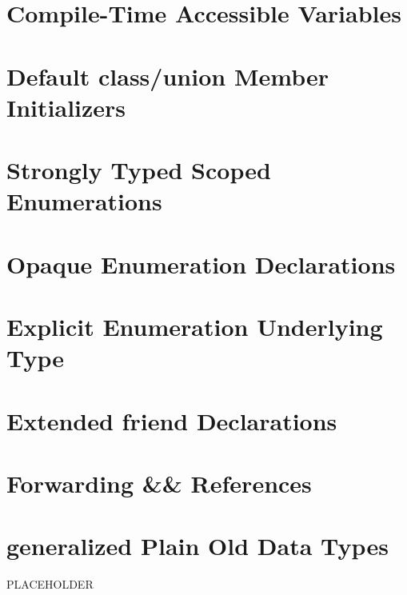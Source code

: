 \newpage
\section[{\tt constexpr} Variables]{Compile-Time Accessible Variables}\label{constexprvar}


\newpage
\section[Default Member Init]{Default {\SecCode class}/{\SecCode union} Member Initializers}\label{Default-Member-Initializers}


\newpage
\section[{\tt enum}~{\tt class}]{Strongly Typed Scoped Enumerations}\label{enumclass}


\newpage
\section[Opaque {\tt enum}s]{Opaque Enumeration Declarations}\label{enumopaque}\label{opaque-enumeration-declarations}


\newpage
\section[Underlying Type '11]{Explicit Enumeration Underlying Type}\label{explicit-enumeration-underlying-type}


\newpage
\section[{\tt friend} '11]{Extended {\SecCode friend} Declarations}\label{extended-friend-declarations}


\newpage
\section[Forwarding References]{Forwarding {\SecCode \&\&} References}\label{forwardingref}\label{forwarding-references}


\newpage
\section[Generalized PODs]{generalized Plain Old Data Types}%
% 
PLACEHOLDER

